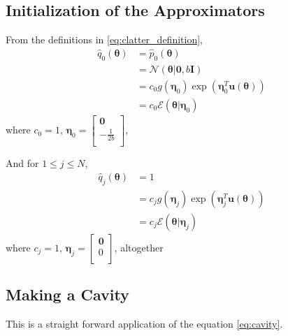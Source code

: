 \documentclass[a4]{article}
\begin{document}
\subsection {Initialization of the Approximators}

From the definitions in \ref{eq:clatter_definition},
\begin{equation}
\begin{aligned}
\hat{q}_0(\bm{\theta}) &= \hat{p}_0(\bm{\theta})\\
&= \mathcal{N}(\bm{\theta}|\bm{0}, b\bm{I})\\
&= c_0 g(\bm{\eta}_0)\exp(\bm{\eta}_0^T\bm{u}(\bm{\theta}))\\
&= c_0 \mathcal{E}(\bm{\theta}|\bm{\eta}_0)
\end{aligned}
\end{equation}
where $c_0 = 1$, $\bm{\eta}_0 = \begin{bmatrix}\bm{0}\\ -\frac{1}{2b}\\\end{bmatrix}$,

And for $1 \le j \le N$,
\begin{equation}
\begin{aligned}
\hat{q}_j(\bm{\theta}) &= 1\\
&= c_j g(\bm{\eta}_j)\exp(\bm{\eta}_j^T\bm{u}(\bm{\theta}))\\
&= c_j \mathcal{E}(\bm{\theta}|\bm{\eta}_j)
\end{aligned}
\end{equation}
where $c_j = 1$, $\bm{\eta}_j = \begin{bmatrix}\bm{0}\\0\\\end{bmatrix}$, altogether



\subsection {Making a Cavity}
This is a straight forward application of the equation \ref{eq:cavity}.
\end{document}

